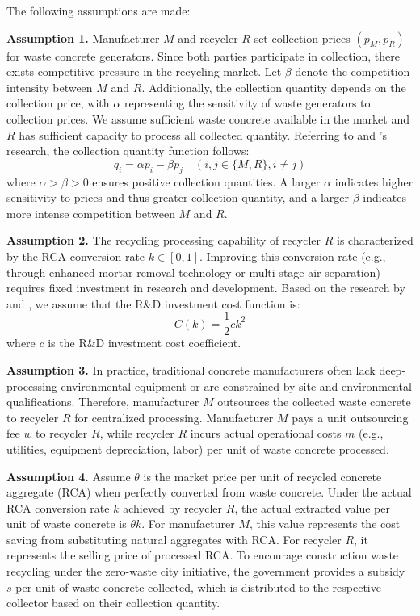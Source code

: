 \documentclass[authoryear,preprint,review,times,10pt]{elsarticle}
\begin{document}
The following assumptions are made:

\textbf{Assumption 1.} Manufacturer $M$ and recycler $R$ set collection prices $(p_M, p_R)$ for waste concrete generators. Since both parties participate in collection, there exists competitive pressure in the recycling market. Let $\beta$ denote the competition intensity between $M$ and $R$. Additionally, the collection quantity depends on the collection price, with $\alpha$ representing the sensitivity of waste generators to collection prices. We assume sufficient waste concrete available in the market and $R$ has sufficient capacity to process all collected quantity. Referring to \citep{chen2025Lowcarbon} and \citep{zhang2024Selection}'s research, the collection quantity function follows:
\begin{equation}
q_i = \alpha p_i - \beta p_j \quad (i,j \in \{M, R\}, i \neq j)
\end{equation}
where $\alpha > \beta > 0$ ensures positive collection quantities. A larger $\alpha$ indicates higher sensitivity to prices and thus greater collection quantity, and a larger $\beta$ indicates more intense competition between $M$ and $R$.

\textbf{Assumption 2.} The recycling processing capability of recycler $R$ is characterized by the RCA conversion rate $k \in [0,1]$. Improving this conversion rate (e.g., through enhanced mortar removal technology or multi-stage air separation) requires fixed investment in research and development. Based on the research by \cite{jones2011Information} and \cite{chen2024Risk}, we assume that the R\&D investment cost function is:
\begin{equation}
C(k) = \frac{1}{2} c k^2
\end{equation}
where $c$ is the R\&D investment cost coefficient.

\textbf{Assumption 3.} In practice, traditional concrete manufacturers often lack deep-processing environmental equipment or are constrained by site and environmental qualifications. Therefore, manufacturer $M$ outsources the collected waste concrete to recycler $R$ for centralized processing. Manufacturer $M$ pays a unit outsourcing fee $w$ to recycler $R$, while recycler $R$ incurs actual operational costs $m$ (e.g., utilities, equipment depreciation, labor) per unit of waste concrete processed.

\textbf{Assumption 4.} Assume $\theta$ is the market price per unit of recycled concrete aggregate (RCA) when perfectly converted from waste concrete. Under the actual RCA conversion rate $k$ achieved by recycler $R$, the actual extracted value per unit of waste concrete is $\theta k$. For manufacturer $M$, this value represents the cost saving from substituting natural aggregates with RCA. For recycler $R$, it represents the selling price of processed RCA. To encourage construction waste recycling under the zero-waste city initiative, the government provides a subsidy $s$ per unit of waste concrete collected, which is distributed to the respective collector based on their collection quantity.
\end{document}
